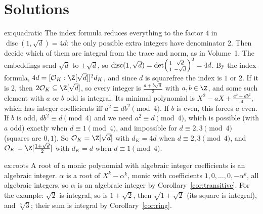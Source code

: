 \section{Solutions}

\begin{solution}{ex:quadratic}
\idea The index formula reduces everything to the factor $4$ in $\operatorname{disc}(1,\sqrt d)=4d$: the only possible
extra integers have denominator $2$. Then decide which of them are integral from the trace and norm, as in Volume~1.
\writeup The embeddings send $\sqrt d$ to $\pm\sqrt d$, so $\operatorname{disc}(1,\sqrt d)=\det
\begin{psmallmatrix}1&\sqrt d\\1&-\sqrt d\end{psmallmatrix}^2=4d$. By the index formula,
$4d=[\mathcal O_K:\Z[\sqrt d]]^2d_K$, and since $d$ is squarefree the index is $1$ or $2$. If it is $2$, then
$2\mathcal O_K\subseteq\Z[\sqrt d]$, so every integer is $\frac{a+b\sqrt d}2$ with $a,b\in\Z$, and some such element
with $a$ or $b$ odd is integral. Its minimal polynomial is $X^2-aX+\frac{a^2-db^2}4$, which has integer coefficients
iff $a^2\equiv db^2\pmod4$. If $b$ is even, this forces $a$ even. If $b$ is odd, $db^2\equiv d\pmod 4$ and we need
$a^2\equiv d\pmod 4$, which is possible (with $a$ odd) exactly when $d\equiv1\pmod4$, and impossible for
$d\equiv2,3\pmod4$ (squares are $0,1$). So $\mathcal O_K=\Z[\sqrt d]$ with $d_K=4d$ when $d\equiv2,3\pmod4$, and
$\mathcal O_K=\Z[\frac{1+\sqrt d}2]$ with $d_K=d$ when $d\equiv1\pmod4$.
\end{solution}

\begin{solution}{ex:roots}
\idea A root of a monic polynomial with algebraic integer coefficients is an algebraic integer.
\writeup $\alpha$ is a root of $X^k-\alpha^k$, monic with coefficients $1,0,\dots,0,-\alpha^k$, all algebraic integers,
so $\alpha$ is an algebraic integer by Corollary~\ref{cor:transitive}. For the example: $\sqrt2$ is integral, so is
$1+\sqrt2$, then $\sqrt{1+\sqrt2}$ (its square is integral), and $\sqrt[5]3$; their sum is integral by
Corollary~\ref{cor:ring}.
\end{solution}

